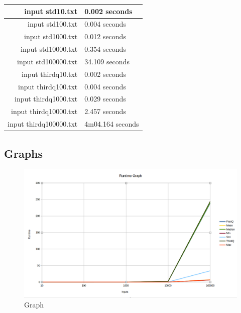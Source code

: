 \documentclass[a4paper, 12pt, titlepage]{article}
\begin{document}
\begin{table}[H]
\begin{tabular}{| r | l |}
\hline
input std10.txt& 0.002 seconds\\
 \hline
input std100.txt& 0.004 seconds\\
\hline
input std1000.txt& 0.012 seconds\\
\hline
input std10000.txt& 0.354 seconds\\
\hline
input std100000.txt& 34.109 seconds\\
\hline
input thirdq10.txt & 0.002 seconds \\
\hline
input thirdq100.txt & 0.004 seconds \\
\hline
input thirdq1000.txt & 0.029 seconds\\
\hline
input thirdq10000.txt & 2.457 seconds\\
\hline
input thirdq100000.txt & 4m04.164 seconds\\
\hline
\end{tabular}
\end{table}

\newpage
\subsection{Graphs}
\begin{figure}[H]
	\centering
	\caption{Graph}
	\label{fig:gta}
	\includegraphics[width=.90\textwidth]{Graph.png} %
\end{figure}
\newpage
\end{document}
